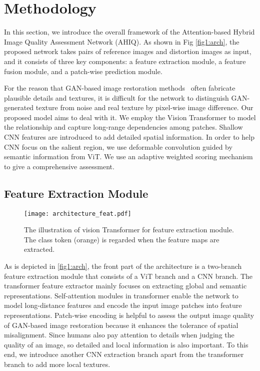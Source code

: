 \documentclass[10pt,twocolumn,letterpaper]{article}
\begin{document}
\section{Methodology}
\label{sec:method}

In this section, we introduce the overall framework of the Attention-based Hybrid Image Quality Assessment Network (AHIQ). As shown in Fig \ref{fig1:arch}, the proposed network takes pairs of reference images and distortion images as input, and it consists of three key components: a feature extraction module, a feature fusion module, and a patch-wise prediction module. 

For the reason that GAN-based image restoration methods~\cite{wang2018esrgan,gu2020image} often fabricate plausible details and textures, it is difficult for the network to distinguish GAN-generated texture from noise and real texture by pixel-wise image difference. Our proposed model aims to deal with it. We employ the Vision Transformer to model the relationship and capture long-range dependencies among patches. Shallow CNN features are introduced to add detailed spatial information. In order to help CNN focus on the salient region, we use deformable convolution guided by semantic information from ViT. We use an adaptive weighted scoring mechanism to give a comprehensive assessment.



\subsection{Feature Extraction Module}
\label{subsec:extraction}
\begin{figure}[th]
\centering
\texttt{[image: architecture\_feat.pdf]}
\caption{The illustration of vision Transformer for feature extraction module. The class token (orange) is regarded when the feature maps are extracted.
}
\label{fig2:feat}
\end{figure}
As is depicted in \cref{fig1:arch}, the front part of the architecture is a two-branch feature extraction module that consists of a ViT branch and a CNN branch. The transformer feature extractor mainly focuses on extracting global and semantic representations. Self-attention modules in transformer enable the network to model long-distance features and encode the input image patches into feature representations. Patch-wise encoding is helpful to assess the output image quality of GAN-based image restoration because it enhances the tolerance of spatial misalignment. Since humans also pay attention to details when judging the quality of an image, so detailed and local information is also important. To this end, we introduce another CNN extraction branch apart from the transformer branch to add more local textures.
\end{document}
